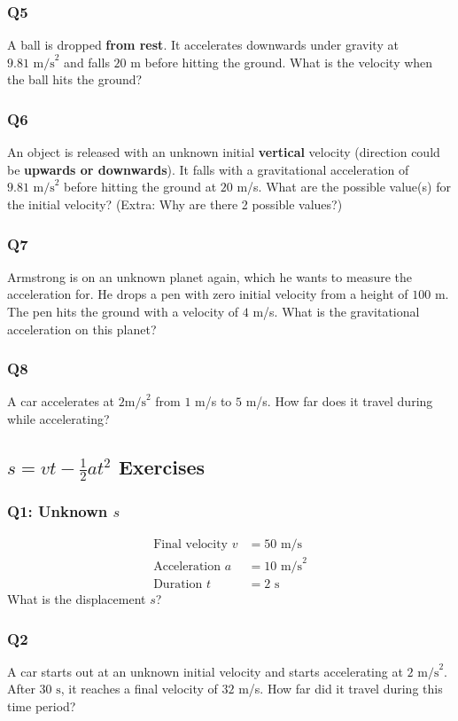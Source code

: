 \documentclass{article}
\begin{document}
\subsubsection{Q5}
A ball is dropped \textbf{from rest}. It accelerates downwards under gravity at $9.81 \text{ m/s}^2$ and falls $20$ m before hitting the ground. What is the velocity when the ball hits the ground? 
\subsubsection{Q6}
An object is released with an unknown initial \textbf{vertical} velocity (direction could be \textbf{upwards or downwards}). It falls with a gravitational acceleration of $9.81 \text{ m/s}^2$ before hitting the ground at $20$ m/s. What are the possible value(s) for the initial velocity? (Extra: Why are there 2 possible values?)
\subsubsection{Q7}
Armstrong is on an unknown planet again, which he wants to measure the acceleration for. He drops a pen with zero initial velocity from a height of $100$ m. The pen hits the ground with a velocity of $4$ m/s. What is the gravitational acceleration on this planet? 
\subsubsection{Q8}
A car accelerates at $2 \text{m/s}^2$ from $1$ m/s to $5$ m/s. How far does it travel during while accelerating? 
\subsection{$s=vt - \frac{1}{2} at^2$ Exercises}
\subsubsection{Q1: Unknown $s$}
\begin{align}
\text{Final velocity } v&=50 \text{ m/s}\\
\text{Acceleration }a&=10 \text{ m/s}^2\\
\text{Duration } t&= 2 \text{ s}
\end{align}
What is the displacement $s$?
\subsubsection{Q2}
A car starts out at an unknown initial velocity and starts accelerating at $2 \text{ m/s}^2$. After $30\text{ s}$, it reaches a final velocity of $32$ m/s. How far did it travel during this time period? 
\end{document}
